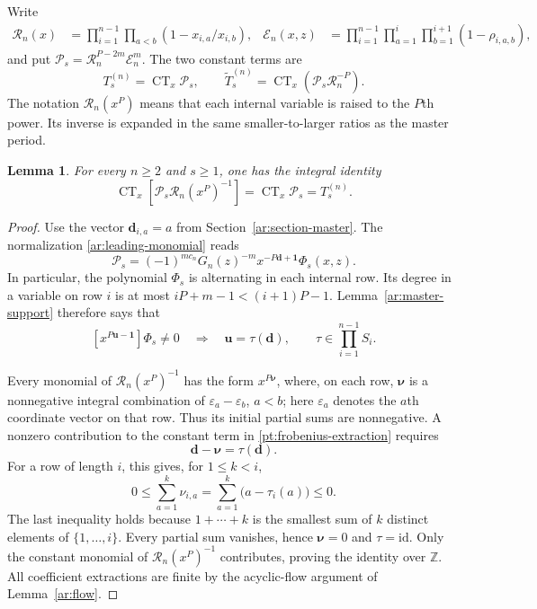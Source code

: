 \documentclass[11pt]{amsart}
\newtheorem{lemma}[theorem]{Lemma}
\theoremstyle{definition}
\theoremstyle{remark}
\numberwithin{equation}{section}
\newcommand{\Z}{\mathbb Z}
\DeclareMathOperator{\CT}{CT}
\begin{document}
Write
\begin{align}
 \mathscr R_n(x)&=\prod_{i=1}^{n-1}\prod_{a<b}
                       (1-x_{i,a}/x_{i,b}),&
 \mathscr E_n(x,z)&=\prod_{i=1}^{n-1}\prod_{a=1}^i
                   \prod_{b=1}^{i+1}(1-\rho_{i,a,b}),
 \label{pt:row-products}
\end{align}
and put $\mathscr P_s=\mathscr R_n^{P-2m}\mathscr E_n^m$.
The two constant terms are
\begin{equation}\label{pt:comparison-constant-terms}
 T_s^{(n)}=\CT_x\mathscr P_s,\qquad
 \widetilde T_s^{(n)}=\CT_x
                      (\mathscr P_s\mathscr R_n^{-P}).
\end{equation}
The notation $\mathscr R_n(x^P)$ means that each internal variable
is raised to the $P$th power. Its inverse is expanded in the
same smaller-to-larger ratios as the master period.

\begin{lemma}\label{pt:integral-extraction}
For every $n\geq2$ and $s\geq1$, one has the integral identity
\begin{equation}\label{pt:frobenius-extraction}
 \CT_x\left[\mathscr P_s\mathscr R_n(x^P)^{-1}\right]
 =\CT_x\mathscr P_s=T_s^{(n)}.
\end{equation}
\end{lemma}

\begin{proof}
Use the vector $\mathbf d_{i,a}=a$ from
Section~\ref{ar:section-master}. The normalization
\eqref{ar:leading-monomial} reads
\begin{equation}\label{pt:normalized-master-polynomial}
 \mathscr P_s=(-1)^{mc_n}G_n(z)^{-m}
                 x^{-P\mathbf d+\mathbf1}\Phi_s(x,z).
\end{equation}
In particular, the polynomial $\Phi_s$ is alternating in each
internal row. Its degree in a variable on row $i$ is at most
$iP+m-1<(i+1)P-1$. Lemma~\ref{ar:master-support} therefore says that
\[
 [x^{P\boldsymbol u-\mathbf1}]\Phi_s\ne0
 \quad\Longrightarrow\quad
 \boldsymbol u=\tau(\mathbf d),\qquad
 \tau\in\prod_{i=1}^{n-1}S_i.
\]

Every monomial of $\mathscr R_n(x^P)^{-1}$ has the form
$x^{P\boldsymbol\nu}$, where, on each row,
$\boldsymbol\nu$ is a nonnegative integral combination of
$\varepsilon_a-\varepsilon_b$, $a<b$; here
$\varepsilon_a$ denotes the $a$th coordinate vector on that row.
Thus its initial partial sums are nonnegative. A nonzero
contribution to the constant term in
\eqref{pt:frobenius-extraction} requires
\[
 \mathbf d-\boldsymbol\nu=\tau(\mathbf d).
\]
For a row of length $i$, this gives, for $1\leq k<i$,
\[
 0\leq\sum_{a=1}^k\nu_{i,a}
   =\sum_{a=1}^k\bigl(a-\tau_i(a)\bigr)\leq0.
\]
The last inequality holds because $1+\cdots+k$ is the smallest
sum of $k$ distinct elements of $\{1,\ldots,i\}$. Every partial
sum vanishes, hence $\boldsymbol\nu=0$ and
$\tau=\mathrm{id}$. Only the constant monomial of
$\mathscr R_n(x^P)^{-1}$ contributes, proving the identity over
$\Z$. All coefficient extractions are finite by the acyclic-flow
argument of Lemma~\ref{ar:flow}.
\end{proof}
\end{document}
